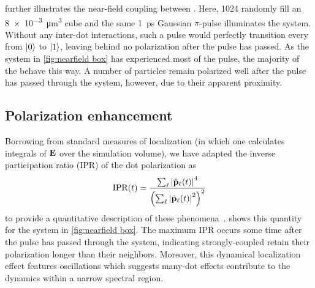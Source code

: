  further illustrates the near-field coupling between \qds{}.
Here, 1024 \qds{} randomly fill an \SI{8e-3}{\micro\meter\cubed} cube and the same \SI{1}{\pico\second} Gaussian $\pi$-pulse illuminates the system.
Without any inter-dot interactions, such a pulse would perfectly transition every \qd{} from $\ket{0}$ to $\ket{1}$, leaving behind no polarization after the pulse has passed.
As the system in \cref{fig:nearfield box} has experienced most of the pulse, the majority of the \qds{} behave this way.
A number of particles remain polarized well after the pulse has passed through the system, however, due to their apparent proximity.

\subsection{Polarization enhancement}

Borrowing from standard measures of localization (in which one calculates integrals of $\vb{E}$ over the simulation volume), we have adapted the inverse participation ratio (IPR)  of the dot polarization as
\begin{equation}
  \text{IPR}(t) = \frac{\sum_\ell \abs{\tilde{\vb{p}}_\ell(t)}^4}{\qty(\sum_\ell \abs{\tilde{\vb{p}}_\ell(t)}^2)^2}
  \label{eq:ipr}
\end{equation}
to provide a quantitative description of these phenomena~\cite{Schwartz2007}.
 shows this quantity for the system in \cref{fig:nearfield box}.
The maximum IPR occurs some time after the pulse has passed through the system, indicating strongly-coupled \qds{} retain their polarization longer than their neighbors.
Moreover, this dynamical localization effect features oscillations which suggests many-dot effects contribute to the dynamics within a narrow spectral region.

